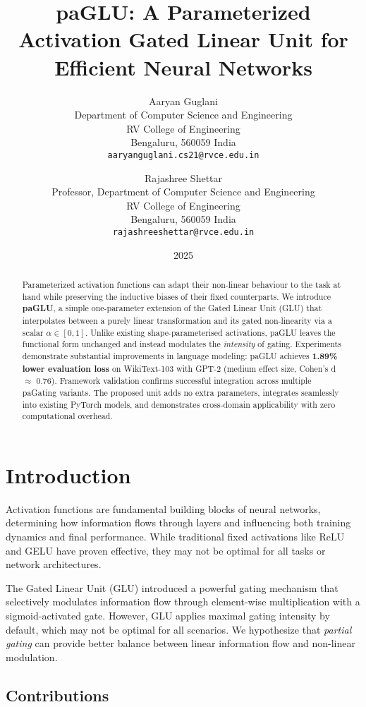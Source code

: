 \documentclass[11pt]{article}
\title{paGLU: A Parameterized Activation Gated Linear Unit for Efficient Neural Networks}
\author{
    Aaryan Guglani \\
    Department of Computer Science and Engineering \\
    RV College of Engineering \\
    Bengaluru, 560059 India \\
    \texttt{aaryanguglani.cs21@rvce.edu.in}
    \and
    Rajashree Shettar \\
    Professor, Department of Computer Science and Engineering \\
    RV College of Engineering \\
    Bengaluru, 560059 India \\
    \texttt{rajashreeshettar@rvce.edu.in}
}
\date{2025}
\begin{document}
\maketitle

\begin{abstract}
Parameterized activation functions can adapt their non-linear behaviour to the task at hand while preserving the inductive biases of their fixed counterparts. We introduce \textbf{paGLU}, a simple one-parameter extension of the Gated Linear Unit (GLU) that interpolates between a purely linear transformation and its gated non-linearity via a scalar $\alpha\in[0,1]$. Unlike existing shape-parameterised activations, paGLU leaves the functional form unchanged and instead modulates the \emph{intensity} of gating. Experiments demonstrate substantial improvements in language modeling: paGLU achieves \textbf{1.89\% lower evaluation loss} on WikiText-103 with GPT-2 (medium effect size, Cohen's d $\approx$ 0.76). Framework validation confirms successful integration across multiple paGating variants. The proposed unit adds no extra parameters, integrates seamlessly into existing PyTorch models, and demonstrates cross-domain applicability with zero computational overhead.
\end{abstract}

\section{Introduction}
\label{sec:introduction}

Activation functions are fundamental building blocks of neural networks, determining how information flows through layers and influencing both training dynamics and final performance. While traditional fixed activations like ReLU \citep{nair2010rectified} and GELU \citep{hendrycks2016gaussian} have proven effective, they may not be optimal for all tasks or network architectures.

The Gated Linear Unit (GLU) \citep{dauphin2017language} introduced a powerful gating mechanism that selectively modulates information flow through element-wise multiplication with a sigmoid-activated gate. However, GLU applies maximal gating intensity by default, which may not be optimal for all scenarios. We hypothesize that \emph{partial gating} can provide better balance between linear information flow and non-linear modulation.

\subsection{Contributions}
\end{document}
